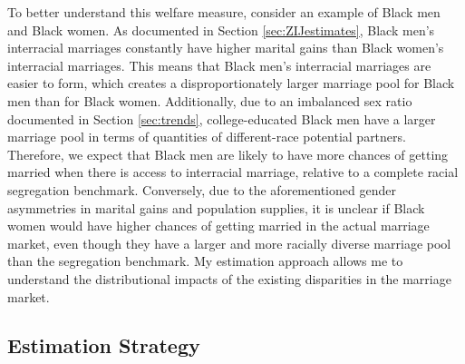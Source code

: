 To better understand this welfare measure, consider an example of Black men and Black women. As documented in Section \ref{sec:ZIJestimates}, Black men's interracial marriages constantly have higher marital gains than Black women's interracial marriages. This means that Black men's interracial marriages are easier to form, which creates a disproportionately larger marriage pool for Black men than for Black women. Additionally,  due to an imbalanced sex ratio documented in Section \ref{sec:trends}, college-educated Black men have a larger marriage pool in terms of quantities of different-race potential partners. Therefore, we expect that Black men are likely to have more chances of getting married when there is access to interracial marriage, relative to a complete racial segregation benchmark. Conversely, due to the aforementioned gender asymmetries in marital gains and population supplies, it is unclear if Black women would have higher chances of getting married in the actual marriage market, even though they have a larger and more racially diverse marriage pool than the segregation benchmark. My estimation approach allows me to understand the distributional impacts of the existing disparities in the marriage market. 

\subsection{Estimation Strategy} \label{sec:gains-estimation}


